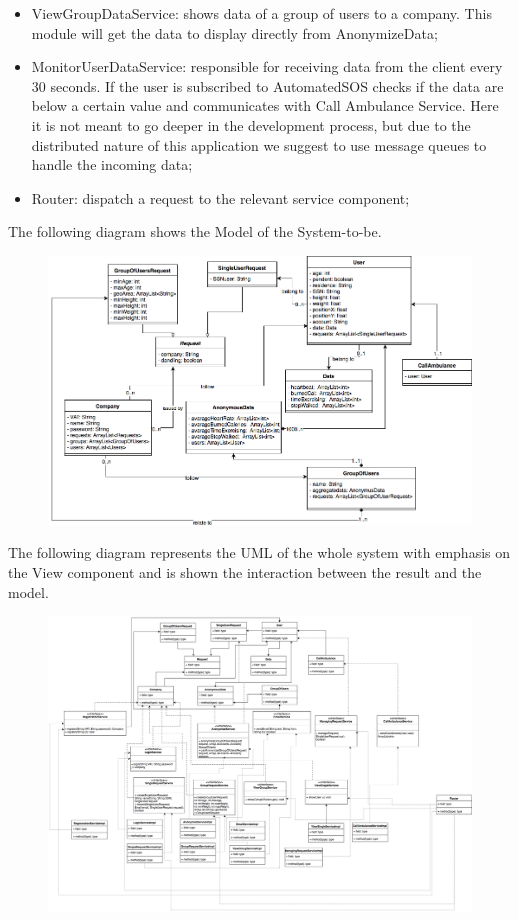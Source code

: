 \documentclass{article}
\begin{document}
\begin{itemize}
\item ViewGroupDataService: shows data of a group of users to a company. This module will get the data to display directly from AnonymizeData;
\item MonitorUserDataService: responsible for receiving data from the client every 30 seconds. If the user is subscribed to AutomatedSOS checks if the data are below a certain value and communicates with Call Ambulance Service. Here it is not meant to go deeper in the development process, but due to the distributed nature of this application we suggest to use message queues to handle the incoming data;
\item Router: dispatch a request to the relevant service component;
\end{itemize}
The following diagram shows the Model of the System-to-be. 
\begin{figure}[h!]
\centering
    \textbf{}\par\medskip
	\includegraphics[width= \linewidth]{model.png}
\end{figure}
\newpage
The following diagram represents the UML of the whole system with emphasis on the View component and is shown the interaction between the result and the model.
\begin{figure}[h!]
\centering
    \textbf{}\par\medskip
	\includegraphics[width= \linewidth]{UMLbig.png}
\end{figure}
\newpage
\end{document}
